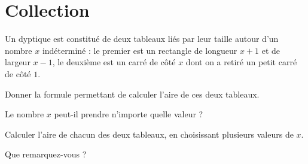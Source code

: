\documentclass{article}
\begin{document}
\section{Collection}
Un dyptique est constitué de deux tableaux liés par leur taille autour d'un nombre $x$ indéterminé : le premier est un rectangle de longueur $x + 1$ et de largeur $x - 1$, le deuxième est un carré de côté $x$ dont on a retiré un petit carré de côté $1$.
\begin{center}
\end{center}
\begin{alphaquestions}
\item Donner la formule permettant de calculer l'aire de ces deux tableaux.
\item Le nombre $x$ peut-il prendre n'importe quelle valeur ?
\item Calculer l'aire de chacun des deux tableaux, en choisissant plusieurs valeurs de $x$.  
\item Que remarquez-vous ?
\end{alphaquestions}
\end{document}
